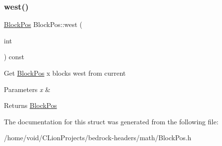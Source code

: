 \subsubsection{\texorpdfstring{west()}{west()}\hspace{0.1cm}{\footnotesize\ttfamily [2/2]}}
{\footnotesize\ttfamily \mbox{\hyperlink{struct_block_pos}{Block\+Pos}} Block\+Pos\+::west (\begin{DoxyParamCaption}\item[{int}]{ }\end{DoxyParamCaption}) const}

Get \mbox{\hyperlink{struct_block_pos}{Block\+Pos}} x blocks west from current 
\begin{DoxyParams}{Parameters}
{\em x} & \\
\hline
\end{DoxyParams}
\begin{DoxyReturn}{Returns}
\mbox{\hyperlink{struct_block_pos}{Block\+Pos}} 
\end{DoxyReturn}


The documentation for this struct was generated from the following file\+:\begin{DoxyCompactItemize}
\item 
/home/void/\+C\+Lion\+Projects/bedrock-\/headers/math/Block\+Pos.\+h\end{DoxyCompactItemize}
